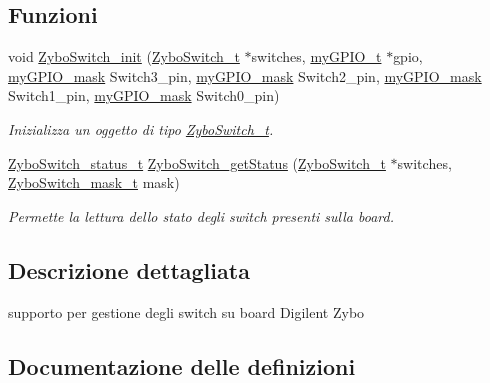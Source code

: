 \subsection*{Funzioni}
\begin{DoxyCompactItemize}
\item 
void \hyperlink{group___switch_ga59108e526347f01f584bf1d6308a126f}{Zybo\+Switch\+\_\+init} (\hyperlink{struct_zybo_switch__t}{Zybo\+Switch\+\_\+t} $\ast$switches, \hyperlink{structmy_g_p_i_o__t}{my\+G\+P\+I\+O\+\_\+t} $\ast$gpio, \hyperlink{group__bare-metal_ga402a0d20afc0cb7c25554b8b023f4253}{my\+G\+P\+I\+O\+\_\+mask} Switch3\+\_\+pin, \hyperlink{group__bare-metal_ga402a0d20afc0cb7c25554b8b023f4253}{my\+G\+P\+I\+O\+\_\+mask} Switch2\+\_\+pin, \hyperlink{group__bare-metal_ga402a0d20afc0cb7c25554b8b023f4253}{my\+G\+P\+I\+O\+\_\+mask} Switch1\+\_\+pin, \hyperlink{group__bare-metal_ga402a0d20afc0cb7c25554b8b023f4253}{my\+G\+P\+I\+O\+\_\+mask} Switch0\+\_\+pin)
\begin{DoxyCompactList}\small\item\em Inizializza un oggetto di tipo \hyperlink{struct_zybo_switch__t}{Zybo\+Switch\+\_\+t}. \end{DoxyCompactList}\item 
\hyperlink{group___switch_ga4ba6b49b2f47ebb464aefcea7e23e04a}{Zybo\+Switch\+\_\+status\+\_\+t} \hyperlink{group___switch_gafac8daf9a9a585f8f20ef2a6fa883a1f}{Zybo\+Switch\+\_\+get\+Status} (\hyperlink{struct_zybo_switch__t}{Zybo\+Switch\+\_\+t} $\ast$switches, \hyperlink{group___switch_ga2e0602a824354f25c395f938caba3703}{Zybo\+Switch\+\_\+mask\+\_\+t} mask)
\begin{DoxyCompactList}\small\item\em Permette la lettura dello stato degli switch presenti sulla board. \end{DoxyCompactList}\end{DoxyCompactItemize}


\subsection{Descrizione dettagliata}
supporto per gestione degli switch su board Digilent Zybo 



\subsection{Documentazione delle definizioni}
\mbox{\label{group___switch_ga1c463f6e1e3a43f68109c176772ce5cc}} 
